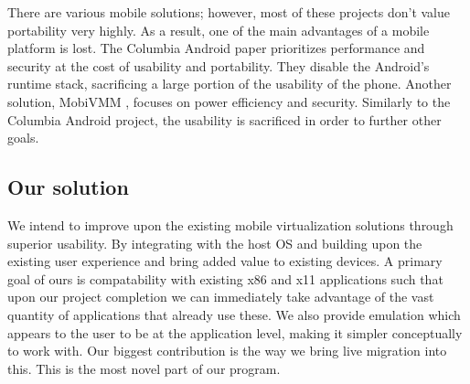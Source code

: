 There are various mobile solutions; however, most of these projects don't value portability very highly.  As a result, one of the main advantages of a mobile platform is lost.  The Columbia Android paper prioritizes performance and security at the cost of usability and portability. They disable the Android's runtime stack, sacrificing a large portion of the usability of the phone.  Another solution, MobiVMM \cite{mobivmm}, focuses on power efficiency and security.  Similarly to the Columbia Android project, the usability is sacrificed in order to further other goals.

\subsection{Our solution}
We intend to improve upon the existing mobile virtualization solutions through superior usability.  By integrating with the host OS and building upon the existing user experience and bring added value to existing devices.
A primary goal of ours is compatability with existing x86 and x11 applications such that upon our project completion we can immediately take advantage of the vast quantity of applications that already use these.
We also provide emulation which appears to the user to be at the application level, making it simpler conceptually to work with.
Our biggest contribution is the way we bring live migration into this.  This is the most novel part of our program.
